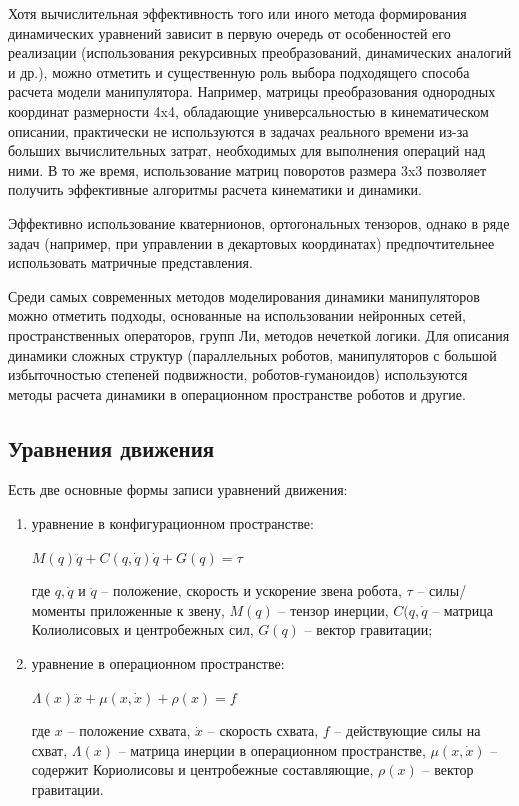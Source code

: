 Хотя вычислительная эффективность того или иного метода формирования динамических уравнений зависит в первую очередь от особенностей его реализации (использования рекурсивных преобразований, динамических аналогий и др.), можно отметить и существенную роль выбора подходящего способа расчета модели манипулятора. Например, матрицы преобразования однородных координат размерности 4x4, обладающие универсальностью в кинематическом описании, практически не используются в задачах реального времени из-за больших вычислительных затрат, необходимых для выполнения операций над ними. В то же время, использование матриц поворотов размера 3x3 позволяет получить эффективные алгоритмы расчета кинематики и динамики. 

Эффективно использование кватернионов, ортогональных тензоров, однако в ряде задач (например, при управлении в декартовых координатах) предпочтительнее использовать матричные представления.

Среди самых современных методов моделирования динамики манипуляторов можно отметить подходы, основанные на использовании нейронных  сетей, пространственных операторов, групп Ли, методов нечеткой логики. Для описания динамики сложных структур (параллельных роботов, манипуляторов с большой избыточностью степеней подвижности, роботов-гуманоидов) используются методы расчета динамики в операционном пространстве роботов и другие.

\subsection{Уравнения движения}

Есть две основные формы записи уравнений движения:

\begin{enumerate}
	\item уравнение в конфигурационном пространстве:
\begin{center}
	$M(q) \ddot q + C(q, \dot q)\dot q + G (q) = \tau$	
\end{center}
где $q, \dot q$ и $\ddot q$ -- положение, скорость и ускорение звена робота, $\tau$ -- силы/моменты приложенные к звену, $M(q)$ -- тензор инерции, $C(q, \dot q$ -- матрица Колиолисовых и центробежных сил, $G(q)$ -- вектор гравитации;

	\item уравнение в операционном пространстве:
\begin{center}
	$\Lambda(x) \ddot x + \mu (x, \dot x) + \rho (x) = f$
\end{center}		
где $x$ -- положение схвата, $\dot x$ -- скорость схвата, $f$ -- действующие силы на схват, $\Lambda(x)$ -- матрица инерции в операционном пространстве, $\mu(x, \dot x)$ -- содержит Кориолисовы и центробежные составляющие, $\rho(x)$ -- вектор гравитации.

\end{enumerate}

